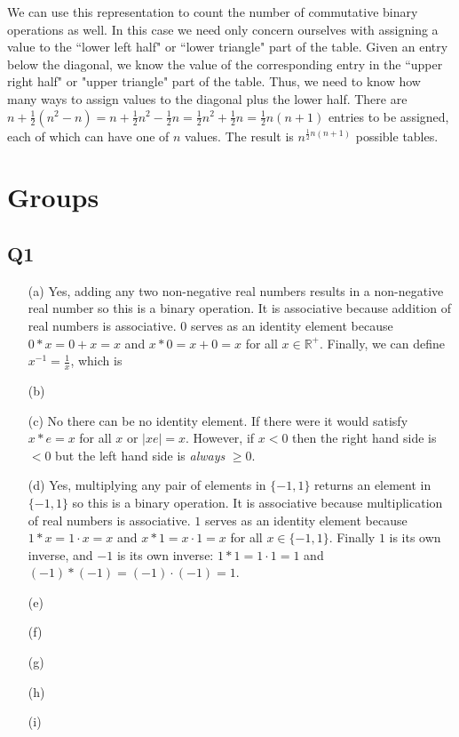\documentclass[12pt]{article}
\def\R{{\mathbb R}}        %
\numberwithin{theorem}{section}
\numberwithin{equation}{section}
\numberwithin{remark}{section}
\numberwithin{definition}{section}
\numberwithin{theorem}{section}
\numberwithin{lemma}{section}
\numberwithin{example}{section}
\begin{document}
\vspace{\baselineskip}

\noindent We can use this representation to count the number of commutative binary operations as well. In this case we need only concern ourselves with assigning a value to the ``lower left half" or ``lower triangle" part of the table. Given an entry below the diagonal, we know the value of the corresponding entry in the ``upper right half" or "upper triangle" part of the table. Thus, we need to know how many ways to assign values to the diagonal plus the lower half. There are $n + \frac{1}{2}(n^2-n) = n + \frac{1}{2}n^2 - \frac{1}{2}n = \frac{1}{2}n^2+\frac{1}{2}n = \frac{1}{2}n(n+1)$ entries to be assigned, each of which can have one of $n$ values. The result is $n^{\frac{1}{2}n(n+1)}$ possible tables. 



\newpage

\section{Groups}

\subsection{Q1}

\begin{itemize}
	\item[(a)]{Yes, adding any two non-negative real numbers results in a non-negative real number so this is a binary operation. It is associative because addition of real numbers is associative. $0$ serves as an identity element because $0*x=0+x=x$ and $x*0=x+0=x$ for all $x\in\R^+$. Finally, we can define $x^{-1}=\frac{1}{x}$, which is }
	\item[(b)]{}
	\item[(c)]{No there can be no identity element. If there were it would satisfy $x*e=x$ for all $x$ or $|xe|=x$. However, if $x<0$ then the right hand side is $<0$ but the left hand side is \emph{always} $\ge 0$.}
	\item[(d)]{Yes, multiplying any pair of elements in $\{-1,1\}$ returns an element in $\{-1,1\}$ so this is a binary operation. It is associative because multiplication of real numbers is associative. $1$ serves as an identity element because $1*x=1\cdot x=x$ and $x*1=x\cdot 1=x$ for all $x\in\{-1,1\}$. Finally $1$ is its own inverse, and $-1$ is its own inverse: $1*1=1\cdot1=1$ and $(-1)*(-1)=(-1)\cdot(-1)=1$.}
	\item[(e)]{}
	\item[(f)]{}
	\item[(g)]{}
	\item[(h)]{}
	\item[(i)]{}
\end{itemize}
\end{document}
